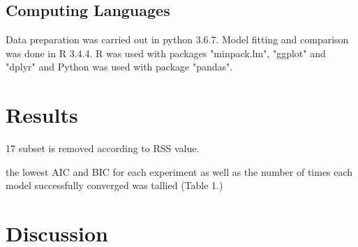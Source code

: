 \documentclass[a4paper,11pt]{article}
\theoremstyle{definition}
\begin{document}
\subsection{Computing Languages}
Data preparation was carried out in python 3.6.7. Model fitting and comparison was done in R 3.4.4. R was used with packages "minpack.lm", "ggplot" and "dplyr" and Python was used with package "pandas". 

\section{Results}
17 subset is removed according to RSS value.

the lowest AIC and BIC for each experiment as well as the number of times each model successfully converged was tallied (Table 1.)



\section{Discussion}

\appendix




  
\end{document}
